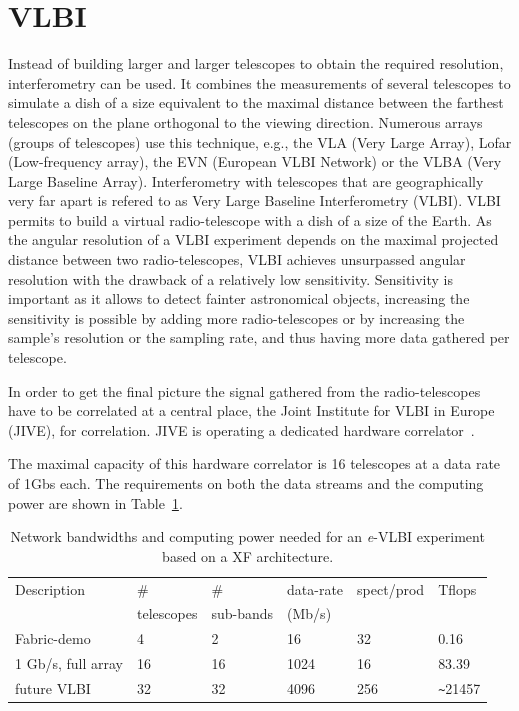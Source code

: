 \section{VLBI}\label{sec:vlbi}
Instead of building larger and larger telescopes to obtain the
required resolution, interferometry can be used. It combines the
measurements of several telescopes to simulate a dish of a size
equivalent to the maximal distance between the farthest telescopes on
the plane orthogonal to the viewing direction. Numerous arrays (groups
of telescopes) use this technique, e.g., the VLA (Very Large Array),
Lofar (Low-frequency array), the EVN (European VLBI Network) or the
VLBA (Very Large Baseline Array).  Interferometry with telescopes that
are geographically very far apart is refered to as Very Large Baseline
Interferometry (VLBI). VLBI permits to build a virtual radio-telescope
with a dish of a size of the Earth. As the angular resolution of a
VLBI experiment depends on the maximal projected distance between two
radio-telescopes, VLBI achieves unsurpassed angular resolution with
the drawback of a relatively low sensitivity. Sensitivity is important
as it allows to detect fainter astronomical objects, increasing the
sensitivity is possible by adding more radio-telescopes or by
increasing the sample's resolution or the sampling rate, and thus
having more data gathered per telescope.

In order to get the final picture the signal gathered from the
radio-telescopes have to be correlated at a central place, the Joint
Institute for VLBI in Europe (JIVE), for correlation.  JIVE is
operating a dedicated hardware correlator~\cite{EVNCorrelator}.

The maximal capacity of this hardware correlator is 16 telescopes at a
data rate of 1Gbs each. The requirements on both the data streams and
the computing power are shown in Table~\ref{tab:speed}.

\begin{table}
  \centering
  \begin{tabular}[c]{|l|l|l|l|l|l|}
    \hline
    Description & \# & \#  & data-rate & spect/prod & Tflops\\
    & telescopes & sub-bands & (Mb/s) &  & \\
    \hline
    \hline
    Fabric-demo &4 &2 &16 &32 &0.16\\
    1 Gb/s, full array  &16 &16 &1024 &16 &83.39\\
    future VLBI &32 &32 &4096 &256 &\verb|~|21457\\
    \hline
  \end{tabular}
  \caption{Network bandwidths and computing power needed for an {\it e}-VLBI
    experiment based on a XF architecture.}
  \label{tab:speed}
\end{table}


